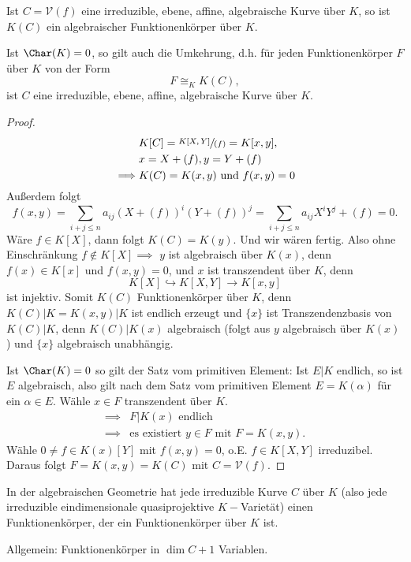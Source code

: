 \begin{satz}
    Ist $C = \mathcal{V}(f)$ eine irreduzible, ebene, affine, algebraische Kurve über $K$, so ist $K(C)$ ein
    algebraischer Funktionenkörper über $K$.

    Ist $\Char(K) = 0$, so gilt auch die Umkehrung, d.h. für jeden Funktionenkörper $F$ über $K$ von der Form
    $$F \cong_K K(C),$$ ist $C$ eine irreduzible, ebene, affine, algebraische Kurve über $K$.
\end{satz}
\begin{proof}
    \begin{align*}
        &K[C] = \sfrac{K[X,Y]}{(f)} = K[x,y], \\
        &x = X + (f), y = Y + (f)\\
        \implies & K(C) = K(x,y) \text{ und } f(x,y) = 0
    \end{align*}
    Außerdem folgt 
    $$ f(x,y) = \sum_{i+j \leq n} a_{ij}(X + (f))^i(Y+(f))^j = \sum_{i+j \leq n} a_{ij} X^iY^j + (f) = 0. $$
    Wäre $f \in K[X]$, dann folgt $K(C) = K(y)$. Und wir wären fertig.
    Also ohne Einschränkung $f \notin K[X] \implies$ $y$ ist algebraisch über $K(x)$, denn $f(x) \in K[x]$ und $f(x,y) = 0$, und
    $x$ ist transzendent über $K$, denn
    $$ K[X] \hookrightarrow K[X,Y] \to K[x,y] $$
    ist injektiv. Somit $K(C)$ Funktionenkörper über $K$, 
    denn $K(C)|K = K(x,y)|K$ ist endlich erzeugt und $\{x\}$ ist Transzendenzbasis von $K(C)|K$, 
    denn $K(C)|K(x)$ algebraisch (folgt aus $y$ algebraisch über $K(x)$) und $\{x\}$ algebraisch unabhängig.

    Ist $\Char(K) = 0$ so gilt der Satz vom primitiven Element:
    Ist $E|K$ endlich, so ist $E$ algebraisch, also gilt nach dem Satz vom primitiven Element $E = K(\alpha)$ für ein $\alpha \in E$.
    Wähle $x \in F$ transzendent über $K$.
    \begin{align*}
        \implies & F|K(x) \text{ endlich}\\
        \implies & \text{es existiert } y \in F \text{ mit } F=K(x,y).
    \end{align*} 
    Wähle $0 \neq f \in K(x)[Y]$ mit $f(x,y) =0$, o.E. $f \in K[X,Y]$ irreduzibel.
    Daraus folgt $F = K(x,y)=K(C)$ mit $C = \mathcal{V}(f)$.
\end{proof}

\begin{bemerkungnr}
    In der algebraischen Geometrie hat jede irreduzible Kurve $C$ über $K$ (also jede irreduzible
    eindimensionale quasiprojektive $K-$Varietät) einen Funktionenkörper, der ein Funktionenkörper
    über $K$ ist. 
    
    Allgemein: Funktionenkörper in $\dim C + 1$ Variablen.
\end{bemerkungnr}

